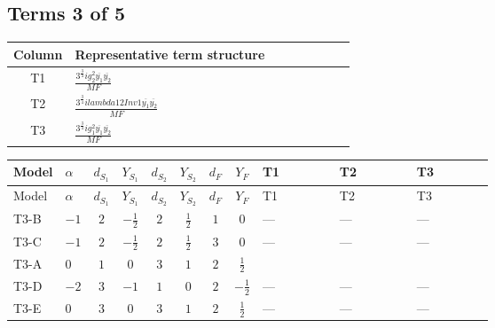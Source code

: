 \documentclass[8pt]{article}
\begin{document}
\begin{landscape}
\subsection*{Terms 3 of 5}
\begin{center}
\begin{tabular}{@{}c >{\raggedright\arraybackslash}p{0.82\linewidth}@{}}
\toprule
Column & Representative term structure \\
\midrule
T1 & \(\displaystyle \frac{3^{\frac{3}{4}} i g_{2}^{2} \overline{y_{1}} \overline{y_{2}}}{MF}\) \\
\midrule
T2 & \(\displaystyle \frac{3^{\frac{3}{4}} i lambda12Inv1 \overline{y_{1}} \overline{y_{2}}}{MF}\) \\
\midrule
T3 & \(\displaystyle \frac{3^{\frac{3}{4}} i g_{1}^{2} \overline{y_{1}} \overline{y_{2}}}{MF}\) \\
\midrule
\bottomrule
\end{tabular}
\end{center}
\smallskip
\tiny
\begin{longtable}{@{}llcccccc >{\raggedright\arraybackslash}p{0.21\linewidth} >{\raggedright\arraybackslash}p{0.21\linewidth} >{\raggedright\arraybackslash}p{0.21\linewidth}@{}}
\toprule
Model & $\alpha$ & $d_{S_1}$ & $Y_{S_1}$ & $d_{S_2}$ & $Y_{S_2}$ & $d_F$ & $Y_F$ & T1 & T2 & T3 \\
\midrule
\endfirsthead
\toprule
Model & $\alpha$ & $d_{S_1}$ & $Y_{S_1}$ & $d_{S_2}$ & $Y_{S_2}$ & $d_F$ & $Y_F$ & T1 & T2 & T3 \\
\midrule
\endhead
T3-B & $-1$ & $2$ & $-\frac{1}{2}$ & $2$ & $\frac{1}{2}$ & $1$ & $0$ & --- & --- & --- \\
\midrule
T3-C & $-1$ & $2$ & $-\frac{1}{2}$ & $2$ & $\frac{1}{2}$ & $3$ & $0$ & --- & --- & --- \\
\midrule
T3-A & $0$ & $1$ & $0$ & $3$ & $1$ & $2$ & $\frac{1}{2}$ & \scriptsize\adjustbox{max width=\linewidth}{$\begin{gathered} - \frac{17 \cdot 3^{\frac{3}{4}} i g_{2}^{2} \overline{y_{1}} \overline{y_{2}}}{24 MF}\end{gathered}$} & \scriptsize\adjustbox{max width=\linewidth}{$\begin{gathered} - \frac{3^{\frac{3}{4}} i lambda12Inv1 \overline{y_{1}} \overline{y_{2}}}{6 MF}\end{gathered}$} & \scriptsize\adjustbox{max width=\linewidth}{$\begin{gathered} - \frac{3^{\frac{3}{4}} i g_{1}^{2} \overline{y_{1}} \overline{y_{2}}}{8 MF}\end{gathered}$} \\
\midrule
T3-D & $-2$ & $3$ & $-1$ & $1$ & $0$ & $2$ & $-\frac{1}{2}$ & --- & --- & --- \\
\midrule
T3-E & $0$ & $3$ & $0$ & $3$ & $1$ & $2$ & $\frac{1}{2}$ & --- & --- & --- \\
\midrule
\bottomrule
\end{longtable}
\clearpage

\end{landscape}
\end{document}
